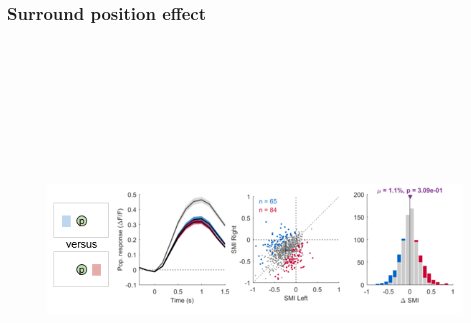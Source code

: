 \subsubsection{Surround position effect}

\begin{figure}[H] \centering \includegraphics[width=11cm,height=11cm,keepaspectratio]{Figures/7.Results/finalPopulation/sel/diagrams/2.png} 
\end{figure}


%


